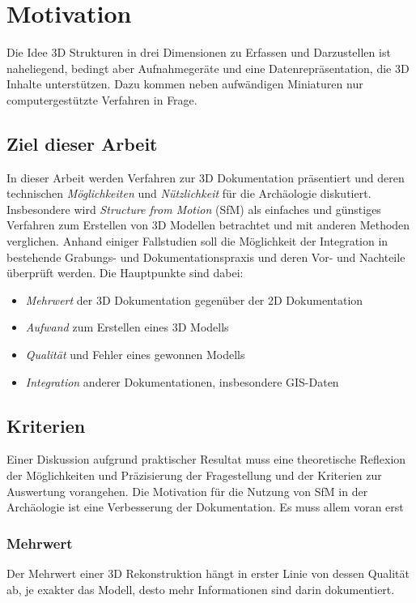 \chapter{Motivation}
	Die Idee 3D Strukturen in drei Dimensionen zu Erfassen und Darzustellen ist naheliegend, bedingt aber Aufnahmegeräte und eine Datenrepräsentation, die 3D Inhalte unterstützen. Dazu kommen neben aufwändigen Miniaturen nur computergestützte Verfahren in Frage.
	
	\section{Ziel dieser Arbeit} \label{frag:ziel}
		In dieser Arbeit werden Verfahren zur 3D Dokumentation präsentiert und deren technischen \emph{Möglichkeiten} und \emph{Nützlichkeit} für die Archäologie diskutiert.
		Insbesondere wird \emph{Structure from Motion} (SfM) als einfaches und günstiges Verfahren zum Erstellen von 3D Modellen betrachtet und mit anderen Methoden verglichen.
		Anhand einiger Fallstudien soll die Möglichkeit der Integration in bestehende Grabungs- und Dokumentationspraxis und deren Vor- und Nachteile überprüft werden.
		Die Hauptpunkte sind dabei:
		\begin{itemize}
			\item
			\emph{Mehrwert} der 3D Dokumentation gegenüber der 2D Dokumentation
			\item
			\emph{Aufwand} zum Erstellen eines 3D Modells
			\item
			\emph{Qualität} und Fehler eines gewonnen Modells
			\item
			\emph{Integration} anderer Dokumentationen, insbesondere GIS-Daten
		\end{itemize}
	
	\section{Kriterien} \label{frag:kriterien} %
		Einer Diskussion aufgrund praktischer Resultat muss eine theoretische Reflexion der Möglichkeiten und Präzisierung der Fragestellung und  der Kriterien zur Auswertung vorangehen.
		Die Motivation für die Nutzung von SfM in der Archäologie ist eine Verbesserung der Dokumentation. Es muss allem voran erst
		\subsection{Mehrwert}
			Der Mehrwert einer 3D Rekonstruktion hängt in erster Linie von dessen Qualität ab, je exakter das Modell, desto mehr Informationen sind darin dokumentiert.
			
